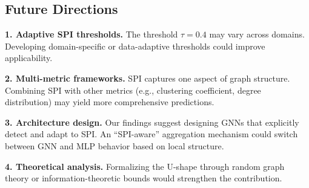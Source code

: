 \subsection{Future Directions}

\textbf{1. Adaptive SPI thresholds.} The threshold $\tau = 0.4$ may vary across domains. Developing domain-specific or data-adaptive thresholds could improve applicability.

\textbf{2. Multi-metric frameworks.} SPI captures one aspect of graph structure. Combining SPI with other metrics (e.g., clustering coefficient, degree distribution) may yield more comprehensive predictions.

\textbf{3. Architecture design.} Our findings suggest designing GNNs that explicitly detect and adapt to SPI. An ``SPI-aware'' aggregation mechanism could switch between GNN and MLP behavior based on local structure.

\textbf{4. Theoretical analysis.} Formalizing the U-shape through random graph theory or information-theoretic bounds would strengthen the contribution.
